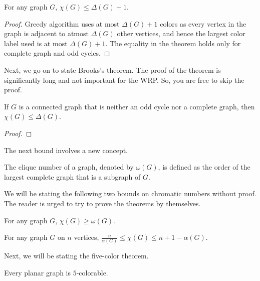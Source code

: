 \begin{thm}
    For any graph $G$, $\chi(G) \le \Delta(G)+1$.
\end{thm}
\begin{proof}
    Greedy algorithm uses at most $\Delta(G)+1$ colors as every vertex in the graph is adjacent to atmost $\Delta(G)$ other vertices, and hence the largest color label used is at most $\Delta(G)+1$. The equality in the theorem holds only for complete graph and odd cycles.
\end{proof}
Next, we go on to state Brooks's theorem. The proof of the theorem is significantly long and not important for the WRP. So, you are free to skip the proof.\\
\begin{thm}
    If $G$ is a connected graph that is neither an odd cycle nor a complete graph, then $\chi(G) \le \Delta(G)$.
\end{thm}
\begin{proof}
    
\end{proof}
The next bound involves a new concept.\\
\begin{defn}
    The clique number of a graph, denoted by $\omega(G)$, is defined as the order of the largest complete graph that is a subgraph of $G$.
\end{defn}
We will be stating the following two bounds on chromatic numbers without proof. The reader is urged to try to prove the theorems by themselves.\\
\begin{thm}
    For any graph $G$, $\chi(G) \ge \omega(G)$.
\end{thm}
\begin{thm}
    For any graph $G$ on $n$ vertices, $\frac{n}{\alpha(G)} \le \chi(G) \le n+1-\alpha(G)$.
\end{thm}
Next, we will be stating the five-color theorem.\\
\begin{thm}
    Every planar graph is $5$-colorable.
\end{thm}
